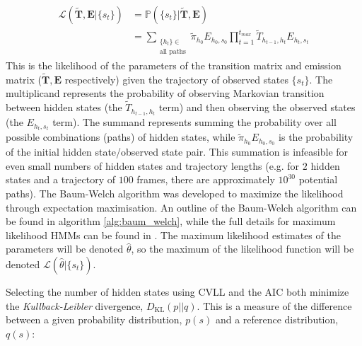 \begin{equation}\label{eqn:obs_lik_full}
\begin{split}
    \mathcal{L}\left(\tilde{\mathbf{T}}, \mathbf{E}| \{s_t\}\right) & = \mathbb{P}\left(\{s_t\} | \tilde{\mathbf{T}}, \mathbf{E}\right) \\
    & = \sum_{\substack{\{h_t\} \in \\ \text{all paths}}} \tilde{\pi}_{h_{0}}E_{h_{0},s_{0}}\prod_{t=1}^{t_{max}}\tilde{T}_{h_{t-1}, h_t}E_{h_t, s_t}    
\end{split}
\end{equation}
This is the likelihood of the parameters of the transition matrix and emission matrix ($\tilde{\mathbf{T}}, \mathbf{E}$ respectively) given the trajectory of observed states $\{s_t\}$. The multiplicand represents the probability of observing Markovian transition between hidden states (the $\tilde{T}_{h_{t-1}, h_{t}}$ term) and then  observing the observed states (the $E_{h_t, s_t}$ term). The summand represents summing the probability over all possible combinations (paths) of hidden states, while $\tilde{\pi}_{h_{0}}E_{ h_{0}, s_{0}}$ is the probability of the initial hidden state/observed state pair. This summation is infeasible for even small numbers of hidden states and trajectory lengths (e.g. for $2$ hidden states and a trajectory of $100$ frames, there are approximately $10^{30}$ potential paths). The Baum-Welch algorithm \cite{rabinerTutorialHiddenMarkov1989} was developed to maximize the likelihood through expectation maximisation. An outline of the Baum-Welch algorithm can be found in algorithm \ref{alg:baum_welch}, while the full details for maximum likelihood HMMs can be found in \cite{noeProjectedHiddenMarkov2013a}. The maximum likelihood estimates of the parameters will be denoted $\hat{\theta}$, so the maximum of the likelihood function will be denoted $\mathcal{L}\left(\hat{\theta}|\{s_t\}\right)$. 

Selecting the number of hidden states using CVLL and the AIC both minimize the \emph{Kullback-Leibler} divergence, $D_{\mathrm{KL}}(p||q)$.  \cite{mclachlanFiniteMixtureModels2000} This is a measure of the difference between a given probability distribution, $p(s)$ and a reference distribution, $q(s)$: 

